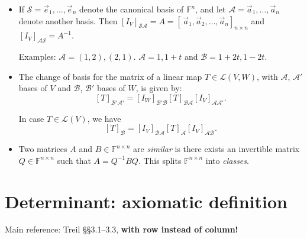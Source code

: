 \documentclass[11pt]{article}
\newcommand{\1}{\mathbf{1}}
\newcommand{\0}{\mathbf{0}}
\newcommand{\A}{\mathcal{A}}
\newcommand{\B}{\mathcal{B}}
\newcommand{\F}{\mathbb{F}}
\newcommand{\cL}{\mathcal{L}}
\newcommand{\cS}{\mathcal{S}}
\newcommand{\va}{\vec{a}}
\newcommand{\ve}{\vec{e}}
\begin{document}
\begin{itemize}
\item

If $\cS=\ve_1,\dots,\ve_n$ denote the canonical basis of $\F^n$, and let $\A=\va_1,\dots,\va_n$ denote another basis.
Then $[I_V]_{\cS\A} = A = [\, \va_1 , \va_2 , \dots , \va_n ]_{n \times n}$ and $[I_V]_{\A\cS} = A^{-1}$.

Examples:
$\A = (1,2),(2,1)$. $\A = 1,1+t$ and $\B = 1+2t,1-2t$.

\item

The change of basis for the matrix of a linear map $T\in\mathcal{L}(V,W)$, with $\A$, $\A'$ bases of $V$ and $\B$, $\B'$ bases of $W$, is given by:
\[
[T]_{\B'\A'}=[I_W]_{\B'\B}[T]_{\B\A}[I_V]_{\A\A'}.
\]

In case $T \in \cL (V)$, we have
\[
[T]_\B = [I_V]_{\B\A} [T]_\A [I_V]_{\A\B}.
\]

\item

Two matrices $A$ and $B\in \F^{n \times n}$ are \emph{similar} is there exists an invertible matrix $Q \in \F^{n \times n}$ such that $A=Q^{-1}BQ$.
This splits $\F^{n \times n}$ into \emph{classes}.

\end{itemize}


\clearpage
\section{Determinant: axiomatic definition}

Main reference:
Treil
\S\S3.1--3.3, \textbf{with row instead of column!}
\end{document}
